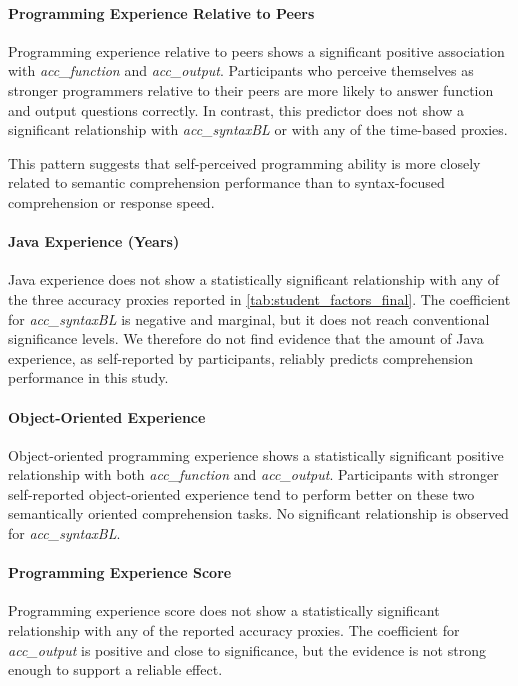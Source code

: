 \paragraph{Programming Experience Relative to Peers}

Programming experience relative to peers shows a significant positive association with \emph{acc\_function} and \emph{acc\_output}. Participants who perceive themselves as stronger programmers relative to their peers are more likely to answer function and output questions correctly. In contrast, this predictor does not show a significant relationship with \emph{acc\_syntaxBL} or with any of the time-based proxies.

This pattern suggests that self-perceived programming ability is more closely related to semantic comprehension performance than to syntax-focused comprehension or response speed.

\paragraph{Java Experience (Years)}

Java experience does not show a statistically significant relationship with any of the three accuracy proxies reported in \cref{tab:student_factors_final}. The coefficient for \emph{acc\_syntaxBL} is negative and marginal, but it does not reach conventional significance levels. We therefore do not find evidence that the amount of Java experience, as self-reported by participants, reliably predicts comprehension performance in this study.

\paragraph{Object-Oriented Experience}

Object-oriented programming experience shows a statistically significant positive relationship with both \emph{acc\_function} and \emph{acc\_output}. Participants with stronger self-reported object-oriented experience tend to perform better on these two semantically oriented comprehension tasks. No significant relationship is observed for \emph{acc\_syntaxBL}.

\paragraph{Programming Experience Score}

Programming experience score does not show a statistically significant relationship with any of the reported accuracy proxies. The coefficient for \emph{acc\_output} is positive and close to significance, but the evidence is not strong enough to support a reliable effect.

